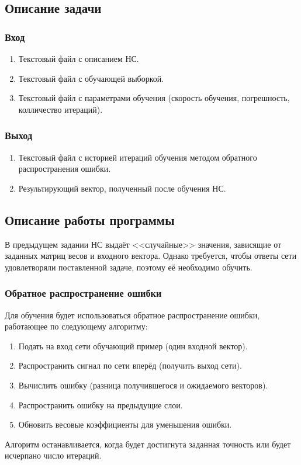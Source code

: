 \documentclass[bachelor, och, pract_otchet]{SCWorks}
\begin{document}
\subsection{Описание задачи}
\subsubsection{Вход}
\begin{enumerate}
  \item Текстовый файл с описанием НС.
  \item Текстовый файл с обучающей выборкой.
  \item Текстовый файл с параметрами обучения 
  (скорость обучения, погрешность, колличество итераций).
\end{enumerate}

\subsubsection{Выход}
\begin{enumerate}
  \item Текстовый файл с историей итераций обучения методом обратного 
  распространения ошибки.
  \item Результирующий вектор, полученный после обучения НС.
\end{enumerate}

\subsection{Описание работы программы}
В предыдущем задании НС выдаёт <<случайные>> значения, зависящие
от заданных матриц весов и входного вектора. Однако требуется, чтобы
ответы сети удовлетворяли поставленной задаче, поэтому её необходимо обучить.

\subsubsection{Обратное распространение ошибки}
Для обучения будет использоваться обратное распространение ошибки, 
работающее по следующему алгоритму:
\begin{enumerate}
  \item Подать на вход сети обучающий пример (один входной вектор).
  \item Распространить сигнал по сети вперёд (получить выход сети).
  \item Вычислить ошибку (разница получившегося и ожидаемого векторов).
  \item Распространить ошибку на предыдущие слои.
  \item Обновить весовые коэффициенты для уменьшения ошибки.
\end{enumerate}
Алгоритм останавливается, когда будет достигнута заданная точность 
или будет исчерпано число итераций.
\end{document}
